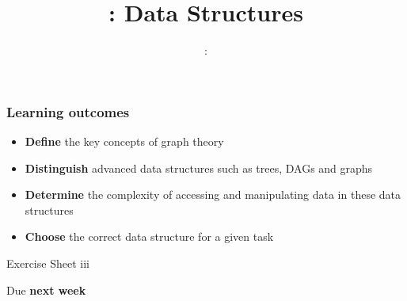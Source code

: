 \usepackage{../../beamerthemeFalmouthGamesAcademy}
\usepackage{multimedia}
\graphicspath{ {../../} }

\lstset{language=Python}

\usepackage[normalem]{ulem}
\usepackage{wasysym}

\usepackage{pdfpages}

\usetikzlibrary{arrows,automata,tikzmark,calc}

\usepackage{algpseudocode}
\usepackage{qtree}




\title{\sessionnumber: Data Structures}
\subtitle{\modulecode: \moduletitle}

\frame{\titlepage} 

\begin{frame}
	\frametitle{Learning outcomes}
	\begin{itemize}
		\item \textbf{Define} the key concepts of graph theory
		\item \textbf{Distinguish} advanced data structures such as trees, DAGs and graphs
		\item \textbf{Determine} the complexity of accessing and manipulating data in these data structures
		\item \textbf{Choose} the correct data structure for a given task
	\end{itemize}
\end{frame}

\begin{frame}{Exercise Sheet iii}
	\begin{center}
		Due \textbf{next week}
	\end{center}
\end{frame}




%


